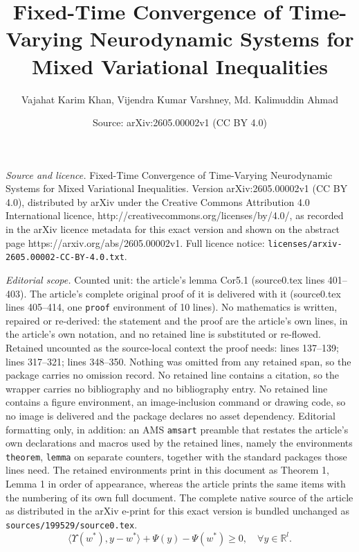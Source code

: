 \documentclass[10pt,a4paper]{amsart}
\title{Fixed-Time Convergence of Time-Varying Neurodynamic Systems for Mixed Variational Inequalities}
\author{Vajahat Karim Khan, Vijendra Kumar Varshney, Md. Kalimuddin Ahmad}
\date{Source: arXiv:2605.00002v1 (CC BY 4.0)}
\begin{document}
\maketitle

\noindent\emph{Source and licence.} Fixed-Time Convergence of Time-Varying Neurodynamic Systems for Mixed Variational Inequalities. Version arXiv:2605.00002v1 (CC BY 4.0), distributed by arXiv under the Creative Commons Attribution 4.0 International licence, http://creativecommons.org/licenses/by/4.0/, as recorded in the arXiv licence metadata for this exact version and shown on the abstract page https://arxiv.org/abs/2605.00002v1. Full licence notice: \texttt{licenses/arxiv-2605.00002-CC-BY-4.0.txt}.\par\smallskip

\noindent\textit{Editorial scope.} Counted unit: the article's lemma Cor5.1 (source0.tex lines 401--403). The article's complete original proof of it is delivered with it (source0.tex lines 405--414, one \texttt{proof} environment of 10 lines). No mathematics is written, repaired or re-derived: the statement and the proof are the article's own lines, in the article's own notation, and no retained line is substituted or re-flowed.  Retained uncounted as the source-local context the proof needs: lines 137--139; lines 317--321; lines 348--350.  Nothing was omitted from any retained span, so the package carries no omission record.  No retained line contains a citation, so the wrapper carries no bibliography and no bibliography entry.  No retained line contains a figure environment, an image-inclusion command or drawing code, so no image is delivered and the package declares no asset dependency.  Editorial formatting only, in addition: an AMS \texttt{amsart} preamble that restates the article's own declarations and macros used by the retained lines, namely the environments \texttt{theorem}, \texttt{lemma} on separate counters, together with the standard packages those lines need.  The retained environments print in this document as Theorem 1, Lemma 1 in order of appearance, whereas the article prints the same items with the numbering of its own full document.  The complete native source of the article as distributed in the arXiv e-print for this exact version is bundled unchanged as \texttt{sources/199529/source0.tex}.
\begin{equation}\label{MV}
    \langle \Upsilon(w^*), y - w^* \rangle + \Psi(y) - \Psi(w^*) \geq 0, \quad \forall y \in \mathbb{R}^l.
\end{equation}
\end{document}
